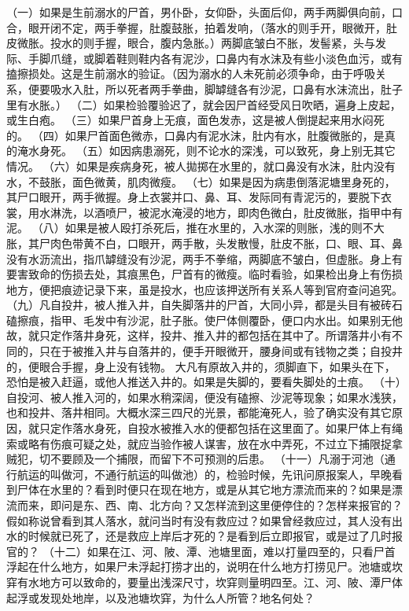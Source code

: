 \documentclass[12pt,UTF8]{ctexbook}
\begin{document}
（一）如果是生前溺水的尸首，男仆卧，女仰卧，头面后仰，两手两脚俱向前，口合，眼开闭不定，两手拳握，肚腹鼓胀，拍着发响，（落水的则手开，眼微开，肚皮微胀。投水的则手握，眼合，腹内急胀。）两脚底皱白不胀，发髻紧，头与发际、手脚爪缝，或脚着鞋则鞋内各有泥沙，口鼻内有水沫及有些小淡色血污，或有搕擦损处。这是生前溺水的验证。（因为溺水的人未死前必须争命，由于呼吸关系，便要吸水入肚，所以死者两手拳曲，脚罅缝各有沙泥，口鼻有水沫流出，肚子里有水胀。）
（二）如果检验覆验迟了，就会因尸首经受风日吹晒，遍身上皮起，或生白疱。
（三）如果尸首身上无痕，面色发赤，这是被人倒提起来用水闷死的。
（四）如果尸首面色微赤，口鼻内有泥水沫，肚内有水，肚腹微胀的，是真的淹水身死。
（五）如因病患溺死，则不论水的深浅，可以致死，身上别无其它情况。
（六）如果是疾病身死，被人拋掷在水里的，就口鼻没有水沫，肚内没有水，不鼓胀，面色微黄，肌肉微瘦。
（七）如果是因为病患倒落泥塘里身死的，其尸口眼开，两手微握。身上衣裳并口、鼻、耳、发际同有青泥污的，要脱下衣裳，用水淋洗，以酒喷尸，被泥水淹浸的地方，即肉色微白，肚皮微胀，指甲中有泥。
（八）如果是被人殴打杀死后，推在水里的，入水深的则胀，浅的则不大胀，其尸肉色带黄不白，口眼开，两手散，头发散慢，肚皮不胀，口、眼、耳、鼻没有水沥流出，指爪罅缝没有沙泥，两手不拳缩，两脚底不皱白，但虚胀。身上有要害致命的伤损去处，其痕黑色，尸首有的微瘦。临时看验，如果检出身上有伤损地方，便把痕迹记录下来，虽是投水，也应该押送所有关系人等到官府查问追究。
（九）凡自投井，被人推入井，自失脚落井的尸首，大同小异，都是头目有被砖石磕擦痕，指甲、毛发中有沙泥，肚子胀。使尸体侧覆卧，便口内水出。如果别无他故，就只定作落井身死，这样，投井、推入井的都包括在其中了。所谓落井小有不同的，只在于被推入井与自落井的，便手开眼微开，腰身间或有钱物之类；自投井的，便眼合手握，身上没有钱物。
大凡有原故入井的，须脚直下，如果头在下，恐怕是被入赶逼，或他人推送入井的。如果是失脚的，要看失脚处的土痕。
（十）自投河、被人推入河的，如果水稍深阔，便没有磕擦、沙泥等现象；如果水浅狭，也和投井、落井相同。大概水深三四尺的光景，都能淹死人，验了确实没有其它原因，就只定作落水身死，自投水被推入水的便都包括在这里面了。如果尸体上有绳索或略有伤痕可疑之处，就应当验作被人谋害，放在水中弄死，不过立下捕限捉拿贼犯，切不要顾及一个捕限，而留下不可预测的后患。
（十一）凡溺于河池（通行航运的叫做河，不通行航运的叫做池）的，检验时候，先讯问原报案人，早晚看到尸体在水里的？看到时便只在现在地方，或是从其它地方漂流而来的？如果是漂流而来，即问是东、西、南、北方向？又怎样流到这里便停住的？怎样来报官的？假如称说曾看到其人落水，就问当时有没有救应过？如果曾经救应过，其人没有出水的时候就已死了，还是救应上岸后才死的？是看到后立即报官，或是过了几时报官的？
（十二）如果在江、河、陂、潭、池塘里面，难以打量四至的，只看尸首浮起在什么地方，如果尸未浮起打捞才出的，说明在什么地方打捞见尸。池塘或坎穽有水地方可以致命的，要量出浅深尺寸，坎穽则量明四至。江、河、陂、潭尸体起浮或发现处地岸，以及池塘坎穽，为什么人所管？地名何处？
\end{document}
